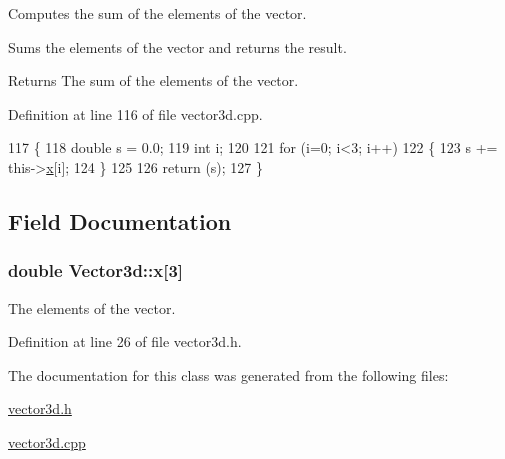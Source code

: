 Computes the sum of the elements of the vector. 

Sums the elements of the vector and returns the result. \begin{DoxyReturn}{Returns}
The sum of the elements of the vector. 
\end{DoxyReturn}


Definition at line 116 of file vector3d.\-cpp.


\begin{DoxyCode}
117 \{
118   \textcolor{keywordtype}{double} s = 0.0;
119   \textcolor{keywordtype}{int} i;
120   
121   \textcolor{keywordflow}{for} (i=0; i<3; i++)
122     \{
123       s += this->\hyperlink{classVector3d_ae5e82a2be7cc2e195e56875a5befe509}{x}[i];
124     \}
125   
126   \textcolor{keywordflow}{return} (s);
127 \}
\end{DoxyCode}


\subsection{Field Documentation}
\hypertarget{classVector3d_ae5e82a2be7cc2e195e56875a5befe509}{
\subsubsection[{x}]{\setlength{\rightskip}{0pt plus 5cm}double Vector3d\-::x\mbox{[}3\mbox{]}\hspace{0.3cm}{\ttfamily [protected]}}}\label{df/dd0/classVector3d_ae5e82a2be7cc2e195e56875a5befe509}


The elements of the vector. 



Definition at line 26 of file vector3d.\-h.



The documentation for this class was generated from the following files\-:\begin{DoxyCompactItemize}
\item 
\hyperlink{vector3d_8h}{vector3d.\-h}\item 
\hyperlink{vector3d_8cpp}{vector3d.\-cpp}\end{DoxyCompactItemize}
